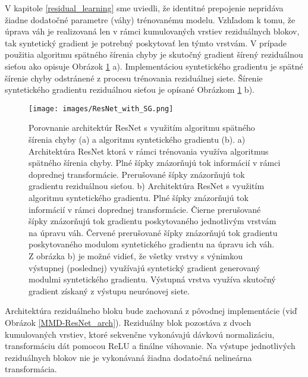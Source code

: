 
V kapitole \ref{residual_learning} sme uviedli, že identitné prepojenie nepridáva žiadne dodatočné parametre (váhy) trénovanému modelu. Vzhľadom k tomu, že úprava váh je realizovaná len v rámci kumulovaných vrstiev reziduálnych blokov, tak syntetický gradient je potrebný poskytovať len týmto vrstvám. V prípade použitia algoritmu spätného šírenia chyby je skutočný gradient šírený reziduálnou sieťou ako opisuje Obrázok \ref{fig:ResNetWithSG} a). Implementáciou syntetického gradientu je spätné šírenie chyby odstránené z procesu trénovania reziduálnej siete. Šírenie syntetického gradientu reziduálnou sieťou je opísané Obrázkom \ref{fig:ResNetWithSG} b).

\begin{figure}

\centerline{\texttt{[image: images/ResNet\_with\_SG.png]}}
\caption[Reziduálna sieť s implementovaným algoritmom syntetického gradientu]{Porovnanie architektúr ResNet s využitím algoritmu spätného šírenia chyby (a) a algoritmu syntetického gradientu (b). a) Architektúra ResNet ktorá v rámci trénovania využíva algoritmus spätného šírenia chyby. Plné šípky znázorňujú tok informácií v rámci doprednej transformácie. Prerušované šípky znázorňujú tok gradientu reziduálnou sieťou. b) Architektúra ResNet s využitím algoritmu syntetického gradientu. Plné šípky znázorňujú tok informácií v rámci doprednej transformácie. Čierne prerušované šípky znázorňujú tok gradientu poskytovaného jednotlivým vrstvám na úpravu váh. Červené prerušované šípky znázorňujú tok gradientu poskytovaného modulom syntetického gradientu na úpravu ich váh. Z obrázka b) je možné vidieť, že všetky vrstvy s výnimkou výstupnej (poslednej) využívajú syntetický gradient generovaný modulmi syntetického gradientu. Výstupná vrstva využíva skutočný gradient získaný z výstupu neurónovej siete.}
\label{fig:ResNetWithSG}
\end{figure}


Architektúra reziduálneho bloku bude zachovaná z pôvodnej implementácie (viď Obrázok \ref{MMD-ResNet_arch}). Reziduálny blok pozostáva z dvoch kumulovaných vrstiev, ktoré sekvenčne vykonávajú dávkovú normalizáciu, transformáciu dát pomocou ReLU a finálne váhovanie. Na výstupe jednotlivých reziduálnych blokov nie je vykonávaná žiadna dodatočná nelineárna transformácia.

